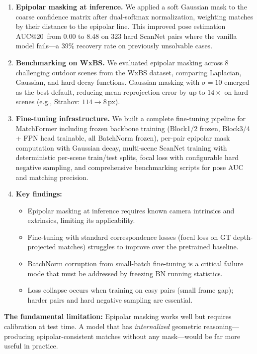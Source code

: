 \documentclass[11pt,a4paper]{article}
\begin{document}
\begin{enumerate}[leftmargin=*]
    \item \textbf{Epipolar masking at inference.} We applied a soft Gaussian mask to the coarse confidence matrix after dual-softmax normalization, weighting matches by their distance to the epipolar line. This improved pose estimation AUC@20\textdegree\ from 0.00 to 8.48 on 323 hard ScanNet pairs where the vanilla model fails---a 39\% recovery rate on previously unsolvable cases.

    \item \textbf{Benchmarking on WxBS.} We evaluated epipolar masking across 8 challenging outdoor scenes from the WxBS dataset, comparing Laplacian, Gaussian, and hard decay functions. Gaussian masking with $\sigma=10$ emerged as the best default, reducing mean reprojection error by up to $14\times$ on hard scenes (e.g., Strahov: $114 \to 8$\,px).

    \item \textbf{Fine-tuning infrastructure.} We built a complete fine-tuning pipeline for MatchFormer including frozen backbone training (Block1/2 frozen, Block3/4 + FPN head trainable, all BatchNorm frozen), per-pair epipolar mask computation with Gaussian decay, multi-scene ScanNet training with deterministic per-scene train/test splits, focal loss with configurable hard negative sampling, and comprehensive benchmarking scripts for pose AUC and matching precision.

    \item \textbf{Key findings:}
    \begin{itemize}
        \item Epipolar masking at inference requires known camera intrinsics and extrinsics, limiting its applicability.
        \item Fine-tuning with standard correspondence losses (focal loss on GT depth-projected matches) struggles to improve over the pretrained baseline.
        \item BatchNorm corruption from small-batch fine-tuning is a critical failure mode that must be addressed by freezing BN running statistics.
        \item Loss collapse occurs when training on easy pairs (small frame gap); harder pairs and hard negative sampling are essential.
    \end{itemize}
\end{enumerate}

\noindent\textbf{The fundamental limitation:} Epipolar masking works well but requires calibration at test time. A model that has \emph{internalized} geometric reasoning---producing epipolar-consistent matches without any mask---would be far more useful in practice.
\end{document}

